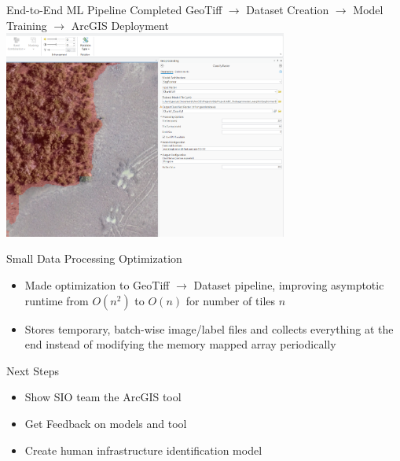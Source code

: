 \begin{frame}{End-to-End ML Pipeline Completed}
    \vspace{1em}
    \centering
    GeoTiff $\rightarrow$ Dataset Creation $\rightarrow$ Model Training $\rightarrow$ ArcGIS Deployment
    \includegraphics[height=0.7\textheight,width=0.7\textwidth,keepaspectratio]{images/arcgis.png}
\end{frame}

\begin{frame}{Small Data Processing Optimization}
    \begin{itemize}
        \item Made optimization to GeoTiff $\rightarrow$ Dataset pipeline, improving asymptotic runtime from $O(n^2)$ to $O(n)$ for number of tiles $n$
        \item Stores temporary, batch-wise image/label files and collects everything at the end instead of modifying the memory mapped array periodically
    \end{itemize}
\end{frame}

\begin{frame}{Next Steps}
    \begin{itemize}
        \item Show SIO team the ArcGIS tool
        \item Get Feedback on models and tool
        \item Create human infrastructure identification model
    \end{itemize}
\end{frame}
